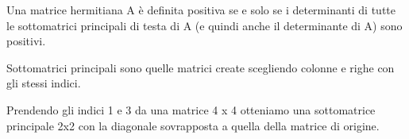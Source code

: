 \begin{theo}
Una matrice hermitiana A \`e definita positiva se e solo se i
determinanti di tutte le sottomatrici principali di testa di A (e quindi anche
il determinante di A) sono positivi.
\end{theo}

\begin{defn}
  Sottomatrici principali sono quelle matrici create scegliendo
  colonne e righe con gli stessi indici.
\end{defn}

\begin{example}
  Prendendo gli indici 1 e 3 da una matrice 4 x 4 otteniamo una
  sottomatrice principale 2x2 con la diagonale sovrapposta a quella
  della matrice di origine.
\end{example}



